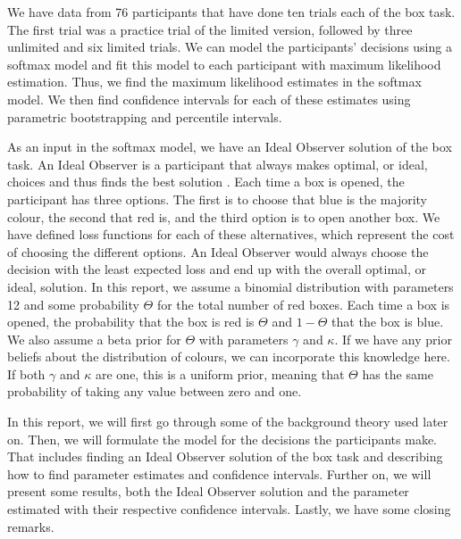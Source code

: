 We have data from 76 participants that have done ten trials each of the box task. The first trial was a practice trial of the limited version, followed by three unlimited and six limited trials. We can model the participants' decisions using a softmax model and fit this model to each participant with maximum likelihood estimation. Thus, we find the maximum likelihood estimates in the softmax model. We then find confidence intervals for each of these estimates using parametric bootstrapping and percentile intervals.

As an input in the softmax model, we have an Ideal Observer solution of the box task. An Ideal Observer is a participant that always makes optimal, or ideal, choices and thus finds the best solution \citep{idealObs}. Each time a box is opened, the participant has three options. The first is to choose that blue is the majority colour, the second that red is, and the third option is to open another box. We have defined loss functions for each of these alternatives, which represent the cost of choosing the different options. An Ideal Observer would always choose the decision with the least expected loss and end up with the overall optimal, or ideal, solution. In this report, we assume a binomial distribution with parameters 12 and some probability $\Theta$ for the total number of red boxes. Each time a box is opened, the probability that the box is red is $\Theta$ and $1-\Theta$ that the box is blue. We also assume a beta prior for $\Theta$ with parameters $\gamma$ and $\kappa$. If we have any prior beliefs about the distribution of colours, we can incorporate this knowledge here. If both $\gamma$ and $\kappa$ are one, this is a uniform prior, meaning that $\Theta$ has the same probability of taking any value between zero and one. 





In this report, we will first go through some of the background theory used later on. Then, we will formulate the model for the decisions the participants make. That includes finding an Ideal Observer solution of the box task and describing how to find parameter estimates and confidence intervals. Further on, we will present some results, both the Ideal Observer solution and the parameter estimated with their respective confidence intervals. Lastly, we have some closing remarks. 